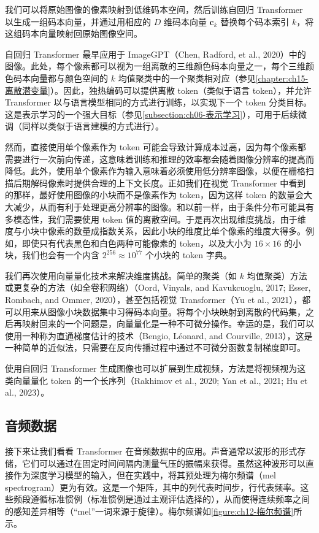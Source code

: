 \documentclass[../../main.tex]{subfiles}
\begin{document}
我们可以将原始图像的像素映射到低维码本空间，然后训练自回归 Transformer 以生成一组码本向量，并通过用相应的 $D$ 维码本向量 $\mathbf{c}_k$ 替换每个码本索引 $k$，将这组码本向量映射回原始图像空间。

自回归 Transformer 最早应用于 ImageGPT（Chen, Radford, et al., 2020）中的图像。此处，每个像素都可以视为一组离散的三维颜色码本向量之一，每个三维颜色码本向量都与颜色空间的 $k$ 均值聚类中的一个聚类相对应（参见\cref{chapter:ch15-离散潜变量}）。因此，独热编码可以提供离散 token（类似于语言 token），并允许 Transformer 以与语言模型相同的方式进行训练，以实现下一个 token 分类目标。这是表示学习的一个强大目标（参见\cref{subsection:ch06-表示学习}），可用于后续微调（同样以类似于语言建模的方式进行）。

然而，直接使用单个像素作为 token 可能会导致计算成本过高，因为每个像素都需要进行一次前向传递，这意味着训练和推理的效率都会随着图像分辨率的提高而降低。此外，使用单个像素作为输入意味着必须使用低分辨率图像，以便在栅格扫描后期解码像素时提供合理的上下文长度。正如我们在视觉 Transformer 中看到的那样，最好使用图像的小块而不是像素作为 token，因为这样 token 的数量会大大减少，从而有利于处理更高分辨率的图像。和以前一样，由于条件分布可能具有多模态性，我们需要使用 token 值的离散空间。于是再次出现维度挑战，由于维度与小块中像素的数量成指数关系，因此小块的维度比单个像素的维度大得多。例如，即使只有代表黑色和白色两种可能像素的 token，以及大小为 $16\times16$ 的小块，我们也会有一个内含 $2^{256}\approx10^{77}$ 个小块的 token 字典。

我们再次使用向量量化技术来解决维度挑战。简单的聚类（如 $k$ 均值聚类）方法或更复杂的方法（如全卷积网络）（Oord, Vinyals, and Kavukcuoglu, 2017; Esser, Rombach, and Ommer, 2020），甚至包括视觉 Transformer（Yu et al., 2021），都可以用来从图像小块数据集中习得码本向量。将每个小块映射到离散的代码集，之后再映射回来的一个问题是，向量量化是一种不可微分操作。幸运的是，我们可以使用一种称为直通梯度估计的技术（Bengio, Léonard, and Courville, 2013），这是一种简单的近似法，只需要在反向传播过程中通过不可微分函数复制梯度即可。

使用自回归 Transformer 生成图像也可以扩展到生成视频，方法是将视频视为这类向量量化 token 的一个长序列（Rakhimov et al., 2020; Yan et al., 2021; Hu et al., 2023）。

\subsection{音频数据}\label{subsection:ch12-音频数据}

接下来让我们看看 Transformer 在音频数据中的应用。声音通常以波形的形式存储，它们可以通过在固定时间间隔内测量气压的振幅来获得。虽然这种波形可以直接作为深度学习模型的输入，但在实践中，将其预处理为梅尔频谱（mel spectrogram）更为有效。这是一个矩阵，其中的列代表时间步，行代表频率。这些频段遵循标准惯例（标准惯例是通过主观评估选择的），从而使得连续频率之间的感知差异相等（“mel”一词来源于旋律）。梅尔频谱如\cref{figure:ch12-梅尔频谱}所示。
\end{document}
